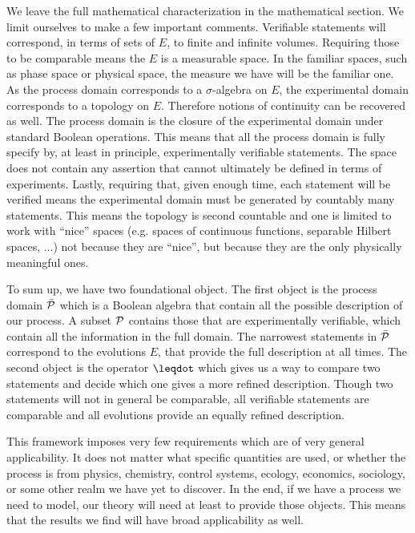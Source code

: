 \documentclass[letterpaper]{article}
\begin{document}
We leave the full mathematical characterization in the mathematical section. We limit ourselves to make a few important comments. Verifiable statements will correspond, in terms of sets of $E$, to finite and infinite volumes. Requiring those to be comparable means the $E$ is a measurable space. In the familiar spaces, such as phase space or physical space, the measure we have will be the familiar one. As the process domain corresponds to a $\sigma$-algebra on $E$, the experimental domain corresponds to a topology on $E$. Therefore notions of continuity can be recovered as well. The process domain is the closure of the experimental domain under standard Boolean operations. This means that all the process domain is fully specify by, at least in principle, experimentally verifiable statements. The space does not contain any assertion that cannot ultimately be defined in terms of experiments. Lastly, requiring that, given enough time, each statement will be verified means the experimental domain must be generated by countably many statements. This means the topology is second countable and one is limited to work with ``nice'' spaces (e.g. spaces of continuous functions, separable Hilbert spaces, ...) not because they are ``nice'', but because they are the only physically meaningful ones.

To sum up, we have two foundational object. The first object is the process domain $\tdomain[P]$ which is a Boolean algebra that contain all the possible description of our process. A subset $\edomain[P]$ contains those that are experimentally verifiable, which contain all the information in the full domain. The narrowest statements in $\tdomain[P]$ correspond to the evolutions $E$, that provide the full description at all times. The second object is the operator $\finer$ which gives us a way to compare two statements and decide which one gives a more refined description. Though two statements will not in general be comparable, all verifiable statements are comparable and all evolutions provide an equally refined description.

This framework imposes very few requirements which are of very general applicability. It does not matter what specific quantities are used, or whether the process is from physics, chemistry, control systems, ecology, economics, sociology, or some other realm we have yet to discover. In the end, if we have a process we need to model, our theory will need at least to provide those objects. This means that the results we find will have broad applicability as well.
\end{document}
